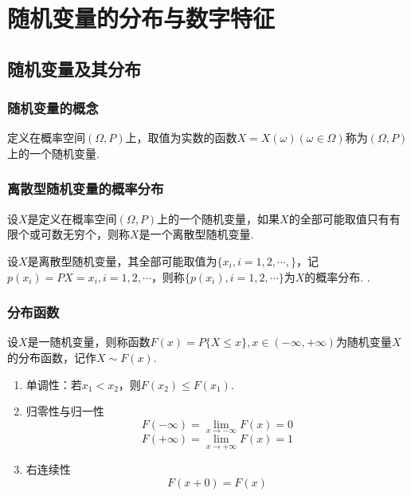 \chapter{随机变量的分布与数字特征}
\thispagestyle{empty}
\section{随机变量及其分布}
\subsection{随机变量的概念}
\tdefination[随机变量]
定义在概率空间$(\Omega,P)$上，取值为实数的函数$X=X(\omega)(\omega\in \Omega)$称为$(\Omega,P)$上的一个随机变量.
\jg
\subsection{离散型随机变量的概率分布}
\tdefination[离散型随机变量]
设$X$是定义在概率空间$(\Omega,P)$上的一个随机变量，如果$X$的全部可能取值只有有限个或可数无穷个，则称$X$是一个离散型随机变量.

设$X$是离散型随机变量，其全部可能取值为$\lbrace x_i,i=1,2,\cdots,\rbrace$，记$p(x_i )=P{X=x_i },i=1,2,\cdots$，则称$\lbrace p(x_i ),i=1,2,\cdots \rbrace$为$X$的概率分布.
.

\subsection{分布函数}
\tdefination[分布函数]
设$X$是一随机变量，则称函数$F(x)=P\lbrace X\le x\rbrace,x\in (-\infty ,+\infty )$为随机变量$X$的分布函数，记作$X\sim F(x)$.\jg

\dya[分布函数的性质]
\begin{enumerate}[1.]
	\setlength{\itemindent}{4em}
	\setlength{\topsep}{0.01em}
	\setlength{\itemsep}{0.01em}
	\item 单调性：若$x_1<x_2$，则$F(x_2)≤F(x_1)$.
	\item 归零性与归一性
	\begin{equation}
	F(-\infty )=\lim\limits_{x \to -\infty }F(x)=0
	\end{equation}
		\begin{equation}
	F(+\infty )=\lim\limits_{x \to +\infty }F(x)=1
	\end{equation}
	\item 右连续性
	\begin{equation}
	F(x+0)=F(x)
	\end{equation}
\end{enumerate}


